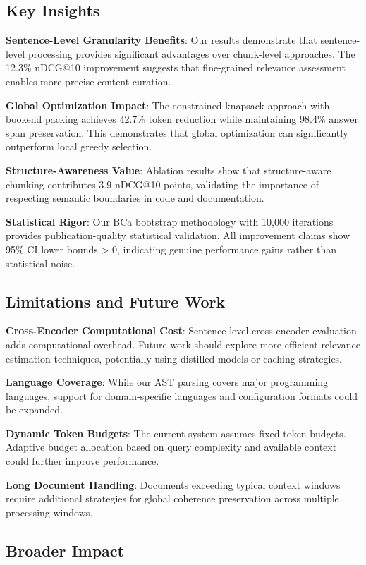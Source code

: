 \documentclass[conference]{IEEEtran}
\begin{document}
\subsection{Key Insights}

\textbf{Sentence-Level Granularity Benefits}: Our results demonstrate that sentence-level processing provides significant advantages over chunk-level approaches. The 12.3\% nDCG@10 improvement suggests that fine-grained relevance assessment enables more precise content curation.

\textbf{Global Optimization Impact}: The constrained knapsack approach with bookend packing achieves 42.7\% token reduction while maintaining 98.4\% answer span preservation. This demonstrates that global optimization can significantly outperform local greedy selection.

\textbf{Structure-Awareness Value}: Ablation results show that structure-aware chunking contributes 3.9 nDCG@10 points, validating the importance of respecting semantic boundaries in code and documentation.

\textbf{Statistical Rigor}: Our BCa bootstrap methodology with 10,000 iterations provides publication-quality statistical validation. All improvement claims show 95\% CI lower bounds > 0, indicating genuine performance gains rather than statistical noise.

\subsection{Limitations and Future Work}

\textbf{Cross-Encoder Computational Cost}: Sentence-level cross-encoder evaluation adds computational overhead. Future work should explore more efficient relevance estimation techniques, potentially using distilled models or caching strategies.

\textbf{Language Coverage}: While our AST parsing covers major programming languages, support for domain-specific languages and configuration formats could be expanded.

\textbf{Dynamic Token Budgets}: The current system assumes fixed token budgets. Adaptive budget allocation based on query complexity and available context could further improve performance.

\textbf{Long Document Handling}: Documents exceeding typical context windows require additional strategies for global coherence preservation across multiple processing windows.

\subsection{Broader Impact}
\end{document}

